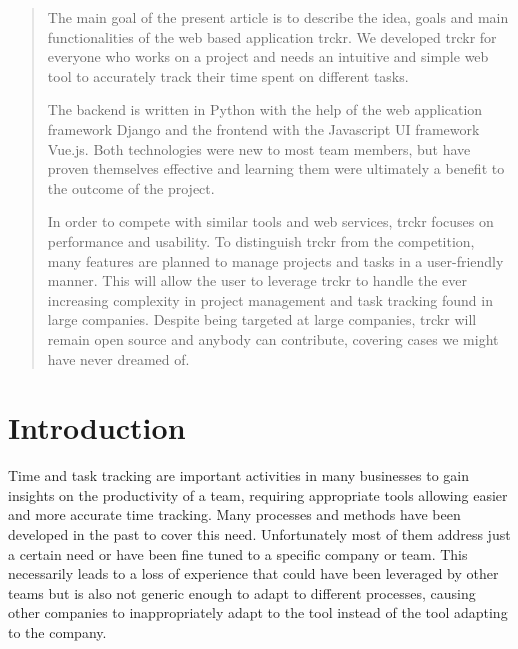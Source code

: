 \documentclass[bibliography=totoc, listof=totocnumbered]{scrartcl}
\begin{document}

\begin{abstract}
  The main goal of the present article is to describe the idea, goals and main
  functionalities of the web based application trckr. We developed trckr for
  everyone who works on a project and needs an intuitive and simple web tool to
  accurately track their time spent on different tasks.

  The backend is written in Python with the help of the web application
  framework Django and the frontend with the Javascript UI framework Vue.js.
  Both technologies were new to most team members, but have proven themselves
  effective and learning them were ultimately a benefit to the outcome of the
  project.

  In order to compete with similar tools and web services, trckr focuses on
  performance and usability. To distinguish trckr from the competition, many
  features are planned to manage projects and tasks in a user-friendly manner.
  This will allow the user to leverage trckr to handle the ever increasing
  complexity in project management and task tracking found in large companies.
  Despite being targeted at large companies, trckr will remain open source and
  anybody can contribute, covering cases we might have never dreamed of.
\end{abstract}

\clearpage

\section{Introduction}
Time and task tracking are important activities in many businesses to gain
insights on the productivity of a team, requiring appropriate tools allowing
easier and more accurate time tracking. Many processes and methods have been
developed in the past to cover this need. Unfortunately most of them address
just a certain need or have been fine tuned to a specific company or team. This
necessarily leads to a loss of experience that could have been leveraged by
other teams but is also not generic enough to adapt to different processes,
causing other companies to inappropriately adapt to the tool instead of the tool
adapting to the company.
\end{document}
